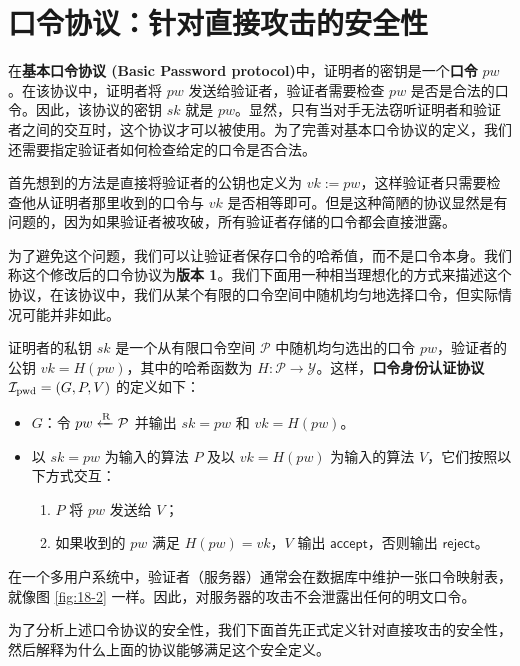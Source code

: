 \section{口令协议：针对直接攻击的安全性}\label{sec:18-3}

在\textbf{基本口令协议 (Basic Password protocol)}中，证明者的密钥是一个\textbf{口令} $pw$。在该协议中，证明者将 $pw$ 发送给验证者，验证者需要检查 $pw$ 是否是合法的口令。因此，该协议的密钥 $sk$ 就是 $pw$。显然，只有当对手无法窃听证明者和验证者之间的交互时，这个协议才可以被使用。为了完善对基本口令协议的定义，我们还需要指定验证者如何检查给定的口令是否合法。

首先想到的方法是直接将验证者的公钥也定义为 $vk:=pw$，这样验证者只需要检查他从证明者那里收到的口令与 $vk$ 是否相等即可。但是这种简陋的协议显然是有问题的，因为如果验证者被攻破，所有验证者存储的口令都会直接泄露。

为了避免这个问题，我们可以让验证者保存口令的哈希值，而不是口令本身。我们称这个修改后的口令协议为\textbf{版本 1}。我们下面用一种相当理想化的方式来描述这个协议，在该协议中，我们从某个有限的口令空间中随机均匀地选择口令，但实际情况可能并非如此。

\begin{snote}[口令协议版本 1.]
证明者的私钥 $sk$ 是一个从有限口令空间 $\mathcal P$ 中随机均匀选出的口令 $pw$，验证者的公钥 $vk=H(pw)$，其中的哈希函数为 $H:\mathcal{P}\to\mathcal{Y}$。这样，\textbf{口令身份认证协议} $\mathcal{I}_{\rm pwd}=(G,P,V)$ 的定义如下：
\begin{itemize}
    \item $G$：令 $pw\xleftarrow{\rm R}\mathcal{P}$ 并输出 $sk=pw$ 和 $vk=H(pw)$。
    \item 以 $sk=pw$ 为输入的算法 $P$ 及以 $vk=H(pw)$ 为输入的算法 $V$，它们按照以下方式交互：
    \begin{enumerate}
        \item $P$ 将 $pw$ 发送给 $V$；
        \item 如果收到的 $pw$ 满足 $H(pw)=vk$，$V$ 输出 $\mathsf{accept}$，否则输出 $\mathsf{reject}$。
    \end{enumerate}
\end{itemize}

在一个多用户系统中，验证者（服务器）通常会在数据库中维护一张口令映射表，就像图 \ref{fig:18-2} 一样。因此，对服务器的攻击不会泄露出任何的明文口令。

为了分析上述口令协议的安全性，我们下面首先正式定义针对直接攻击的安全性，然后解释为什么上面的协议能够满足这个安全定义。
\end{snote}

